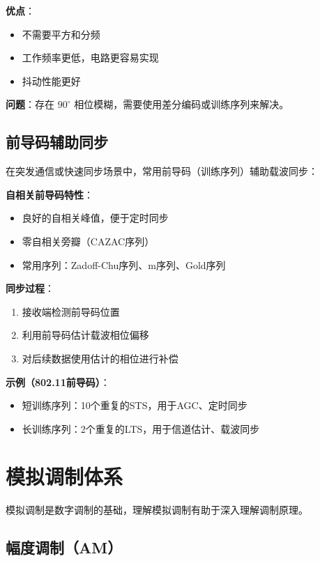\textbf{优点}：
\begin{itemize}
    \item 不需要平方和分频
    \item 工作频率更低，电路更容易实现
    \item 抖动性能更好
\end{itemize}

\textbf{问题}：存在 $90^{\circ}$ 相位模糊，需要使用差分编码或训练序列来解决。

\subsection{前导码辅助同步}
\label{sec:pilot_sync}

在突发通信或快速同步场景中，常用前导码（训练序列）辅助载波同步：

\textbf{自相关前导码特性}：
\begin{itemize}
    \item 良好的自相关峰值，便于定时同步
    \item 零自相关旁瓣（CAZAC序列）
    \item 常用序列：Zadoff-Chu序列、m序列、Gold序列
\end{itemize}

\textbf{同步过程}：
\begin{enumerate}
    \item 接收端检测前导码位置
    \item 利用前导码估计载波相位偏移
    \item 对后续数据使用估计的相位进行补偿
\end{enumerate}

\textbf{示例（802.11前导码）}：
\begin{itemize}
    \item 短训练序列：10个重复的STS，用于AGC、定时同步
    \item 长训练序列：2个重复的LTS，用于信道估计、载波同步
\end{itemize}

\section{模拟调制体系}
\label{sec:analog_modulation_system}

模拟调制是数字调制的基础，理解模拟调制有助于深入理解调制原理。

\subsection{幅度调制（AM）}
\label{sec:am_modulation}


